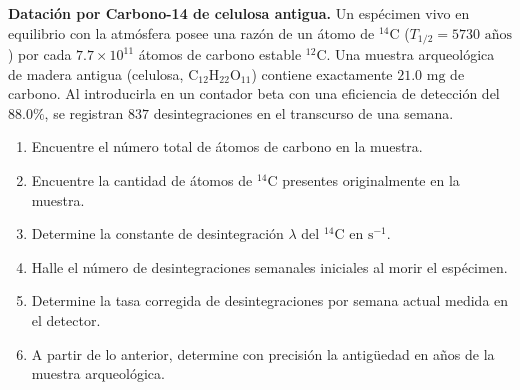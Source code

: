 \item \textbf{Datación por Carbono-14 de celulosa antigua.}
Un espécimen vivo en equilibrio con la atmósfera posee una razón de un átomo de $^{14}\text{C}$ ($T_{1/2} = 5730\text{ años}$) por cada $7.7 \times 10^{11}$ átomos de carbono estable $^{12}\text{C}$. Una muestra arqueológica de madera antigua (celulosa, $\text{C}_{12}\text{H}_{22}\text{O}_{11}$) contiene exactamente $21.0\text{ mg}$ de carbono. Al introducirla en un contador beta con una eficiencia de detección del $88.0\%$, se registran $837$ desintegraciones en el transcurso de una semana.
\begin{enumerate}
    \item Encuentre el número total de átomos de carbono en la muestra.
    \item Encuentre la cantidad de átomos de $^{14}\text{C}$ presentes originalmente en la muestra.
    \item Determine la constante de desintegración $\lambda$ del $^{14}\text{C}$ en $\text{s}^{-1}$.
    \item Halle el número de desintegraciones semanales iniciales al morir el espécimen.
    \item Determine la tasa corregida de desintegraciones por semana actual medida en el detector.
    \item A partir de lo anterior, determine con precisión la antigüedad en años de la muestra arqueológica.
\end{enumerate}